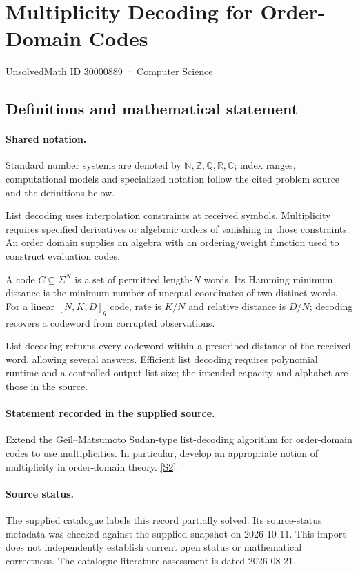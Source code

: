 \documentclass[11pt]{article}
\newcommand{\sref}[2]{\hyperlink{source:#1:#2}{[S#2]}}
\begin{document}
\setcounter{section}{30000888}
\section{Multiplicity Decoding for Order-Domain Codes}\label{30000889}
{\small\sffamily UnsolvedMath ID 30000889 · Computer Science}
\subsection{Definitions and mathematical statement}

\paragraph{Shared notation.}Standard number systems are denoted by $\mathbb N,\mathbb Z,\mathbb Q,\mathbb R,\mathbb C$; index ranges, computational models and specialized notation follow the cited problem source and the definitions below.


List decoding uses interpolation constraints at received symbols. Multiplicity requires specified derivatives or algebraic orders of vanishing in those constraints. An order domain supplies an algebra with an ordering/weight function used to construct evaluation codes.

A code $C\subseteq\Sigma^N$ is a set of permitted length-$N$ words. Its Hamming minimum distance is the minimum number of unequal coordinates of two distinct words. For a linear $[N,K,D]_q$ code, rate is $K/N$ and relative distance is $D/N$; decoding recovers a codeword from corrupted observations.

List decoding returns every codeword within a prescribed distance of the received word, allowing several answers. Efficient list decoding requires polynomial runtime and a controlled output-list size; the intended capacity and alphabet are those in the source.
\paragraph{Statement recorded in the supplied source.}
Extend the Geil–Matsumoto Sudan-type list-decoding algorithm for order-domain codes to use multiplicities. In particular, develop an appropriate notion of multiplicity in order-domain theory. \sref{30000889}{2}
\paragraph{Source status.}
The supplied catalogue labels this record partially solved. Its source-status metadata was checked against the supplied snapshot on 2026-10-11. This import does not independently establish current open status or mathematical correctness. The catalogue literature assessment is dated 2026-08-21.
\end{document}
